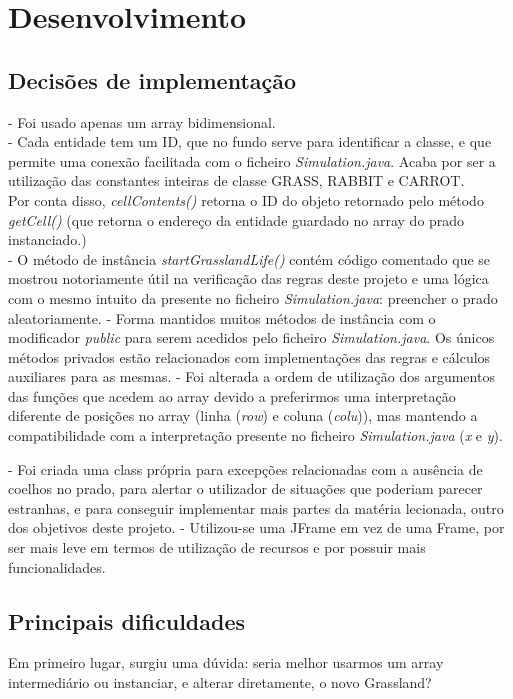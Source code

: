 \documentclass {report}
\begin{document}
\section*{Desenvolvimento}
	\subsection*{Decisões de implementação}
	- Foi usado apenas um array bidimensional.\\
	- Cada entidade tem um ID, que no fundo serve para identificar a classe,
	e que permite uma conexão facilitada com o ficheiro \textit{Simulation.java}. 
	Acaba por ser a utilização das constantes inteiras de classe GRASS, RABBIT e CARROT.\\
	Por conta disso, \textit{cellContents()} retorna o ID do objeto retornado pelo método 
	\textit{getCell()} (que retorna o endereço da entidade guardado no array do prado instanciado.)\\
	- O método de instância \textit{startGrasslandLife()} contém código comentado que se mostrou
	notoriamente útil na verificação das regras deste projeto e uma lógica
	com o mesmo intuito da presente no ficheiro \textit{Simulation.java}: preencher o prado aleatoriamente.
	- Forma mantidos muitos métodos de instância com o modificador \textit{public} 
	para serem acedidos pelo ficheiro \textit{Simulation.java}. Os únicos métodos privados 
	estão relacionados com implementações das regras e cálculos auxiliares para as mesmas.
	- Foi alterada a ordem de utilização dos argumentos das funções que acedem ao array
	devido a preferirmos uma interpretação diferente de posições no array (linha (\textit{row}) e coluna (\textit{colu})),
	mas mantendo a compatibilidade com a interpretação presente no ficheiro \textit{Simulation.java} (\textit{x} e \textit{y}).

	- Foi criada uma class própria para excepções relacionadas com a ausência de coelhos no prado,
	para alertar o utilizador de situações que poderiam parecer estranhas, e para conseguir implementar mais partes da matéria
	lecionada, outro dos objetivos deste projeto.
	- Utilizou-se uma JFrame em vez de uma Frame, por ser mais leve em termos de utilização de recursos e por possuir mais funcionalidades.
	\subsection*{Principais dificuldades}
	Em primeiro lugar, surgiu uma dúvida: seria melhor usarmos um array intermediário ou instanciar, e alterar diretamente, o novo Grassland?\\
\end{document}
